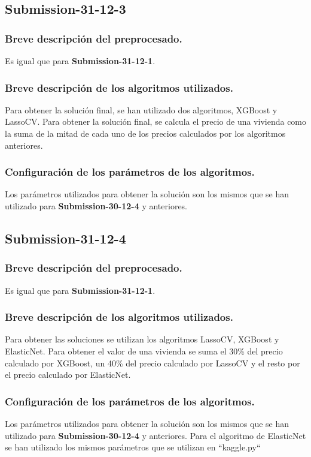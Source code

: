 	
	\subsection{Submission-31-12-3}
	\subsubsection{Breve descripción del preprocesado.}
	Es igual que para \textbf{Submission-31-12-1}.
	\subsubsection{Breve descripción de los algoritmos utilizados.}
		Para obtener la solución final, se han utilizado dos algoritmos, XGBoost y LassoCV. Para obtener la solución final, se calcula el precio de una vivienda como la suma de la mitad de cada uno de los precios calculados por los algoritmos anteriores.
	\subsubsection{Configuración de los parámetros de los algoritmos.}
	Los parámetros utilizados para obtener la solución son los mismos que se han utilizado para \textbf{Submission-30-12-4} y anteriores.
	
	\subsection{Submission-31-12-4}
	\subsubsection{Breve descripción del preprocesado.}
	Es igual que para \textbf{Submission-31-12-1}.
	\subsubsection{Breve descripción de los algoritmos utilizados.}
	Para obtener las soluciones se utilizan los algoritmos LassoCV, XGBoost y ElasticNet. Para obtener el valor de una vivienda se suma el 30\% del precio calculado por XGBoost, un 40\% del precio calculado por LassoCV y el resto por el precio calculado por ElasticNet.
	\subsubsection{Configuración de los parámetros de los algoritmos.}
	Los parámetros utilizados para obtener la solución son los mismos que se han utilizado para \textbf{Submission-30-12-4} y anteriores. Para el algoritmo de ElasticNet se han utilizado los mismos parámetros que se utilizan en ``kaggle.py``
	
